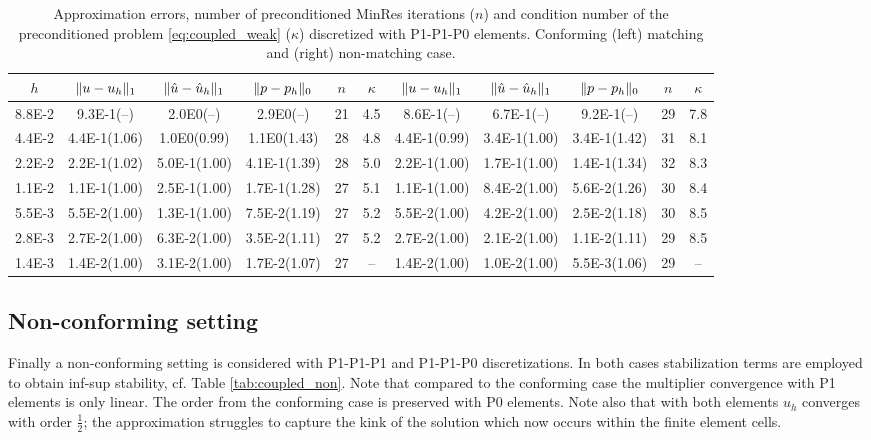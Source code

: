 \documentclass[r]{siamart171218}
\begin{document}
\begin{table}
  \begin{center}
    \scriptsize{
  \begin{tabular}{c|ccc|c|c||ccc|c|c}
    \hline
    $h$ & $\lVert{u-u_h}\rVert_1$ & $\lVert{\hat{u}-\hat{u}_h}\rVert_1$ & $\lVert{p-p_h}\rVert_0$ & $n$ & $\kappa$
        & $\lVert{u-u_h}\rVert_1$ & $\lVert{\hat{u}-\hat{u}_h}\rVert_1$ & $\lVert{p-p_h}\rVert_0$ & $n$ & $\kappa$ \\
    \hline
8.8E-2 & 9.3E-1(--)   & 2.0E0(--)    & 2.9E0(--)    & 21 & 4.5 & 8.6E-1(--)   & 6.7E-1(--)   & 9.2E-1(--)   & 29 & 7.8\\
4.4E-2 & 4.4E-1(1.06) & 1.0E0(0.99)  & 1.1E0(1.43)  & 28 & 4.8 & 4.4E-1(0.99) & 3.4E-1(1.00) & 3.4E-1(1.42) & 31 & 8.1\\
2.2E-2 & 2.2E-1(1.02) & 5.0E-1(1.00) & 4.1E-1(1.39) & 28 & 5.0 & 2.2E-1(1.00) & 1.7E-1(1.00) & 1.4E-1(1.34) & 32 & 8.3\\
1.1E-2 & 1.1E-1(1.00) & 2.5E-1(1.00) & 1.7E-1(1.28) & 27 & 5.1 & 1.1E-1(1.00) & 8.4E-2(1.00) & 5.6E-2(1.26) & 30 & 8.4\\
5.5E-3 & 5.5E-2(1.00) & 1.3E-1(1.00) & 7.5E-2(1.19) & 27 & 5.2 & 5.5E-2(1.00) & 4.2E-2(1.00) & 2.5E-2(1.18) & 30 & 8.5\\
2.8E-3 & 2.7E-2(1.00) & 6.3E-2(1.00) & 3.5E-2(1.11) & 27 & 5.2 & 2.7E-2(1.00) & 2.1E-2(1.00) & 1.1E-2(1.11) & 29 & 8.5\\
1.4E-3 & 1.4E-2(1.00) & 3.1E-2(1.00) & 1.7E-2(1.07) & 27 & --  & 1.4E-2(1.00) & 1.0E-2(1.00) & 5.5E-3(1.06) & 29 & -- \\
    \hline
  \end{tabular}
    }
    \caption{Approximation errors, number of preconditioned MinRes iterations ($n$) and
      condition number of the preconditioned problem \eqref{eq:coupled_weak} ($\kappa$) discretized
      with P1-P1-P0 elements. Conforming (left) matching and (right) non-matching case.}
  \label{tab:coupled_p1_p0}
  \end{center}
\end{table}


\subsection{Non-conforming setting}
Finally a non-conforming setting is considered with P1-P1-P1 and P1-P1-P0
discretizations. In both cases stabilization terms are employed to obtain
inf-sup stability, cf. Table \ref{tab:coupled_non}. Note that compared to the
conforming case the multiplier convergence with P1 elements is only linear.
The order from the conforming case is preserved with P0 elements. Note also
that with both elements $u_h$ converges with order $\tfrac{1}{2}$; the approximation
struggles to capture the kink of the solution which now occurs within the finite element
cells.
\end{document}
